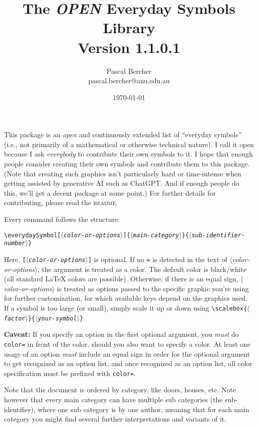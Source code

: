 \documentclass{article}
\newcommand{\meta}[1]{$\langle$\textit{\textrm{#1}}$\rangle$}
\newcommand{\marg}[1]{\texttt{\{\meta{#1}\}}}
\newcommand{\oarg}[1]{\texttt{[\meta{#1}]}}
\newcommand{\cs}[1]{\texttt{\textbackslash#1}}
\begin{document}
\title{The \emph{OPEN} Everyday Symbols Library\\[1ex]\large Version 1.1.0.1}
\author{Pascal Bercher\\pascal.bercher@anu.edu.au}
\date{\today}

\maketitle

This package is an \emph{open} and continuously extended list of ``everyday symbols'' (i.e., not primarily of a mathematical or otherwise technical nature). I call it open because I ask \emph{everybody} to contribute their own symbols to it. I hope that enough people consider creating their own symbols and contribute them to this package. (Note that creating such graphics isn't particularly hard or time-intense when getting assisted by generative AI such as ChatGPT. And if enough people do this, we'll get a decent package at some point.) For further details for contributing, please read the \textsc{readme}.

Every command follows the structure:
\begin{center}
  \cs{everydaySymbol}\oarg{color-or-options}\marg{main-category}\marg{sub-identifier-number}
\end{center}
Here, \oarg{color-or-options} is optional. If no \verb+=+ is detected in the text of \meta{color-or-options}, the argument is treated as a color. The default color is black/white (all standard \LaTeX{} colors are possible). Otherwise, if there is an equal sign, \meta{color-or-options} is treated as options passed to the specific graphic you're using for further customization, for which available keys depend on the graphics used. If a symbol is too large (or small), simply scale it up or down using
\cs{scalebox}\marg{factor}\marg{your-symbol}.

\textbf{Caveat:} If you specify an option in the first optional argument, you \emph{must} do \verb+color=+ in front of the color, should you also want to specify a color. At least one usage of an option \emph{must} include an equal sign in order for the optional argument to get recognized as an option list, and once recognized as an option list, all color specification must be prefixed with \verb|color=|.

Note that the document is ordered by category, like doors, houses, etc. Note however that every main category can have multiple sub categories (the sub-identifier), where one sub category is by one author, meaning that for each main category you might find several further interpretations and variants of it. 
\end{document}
